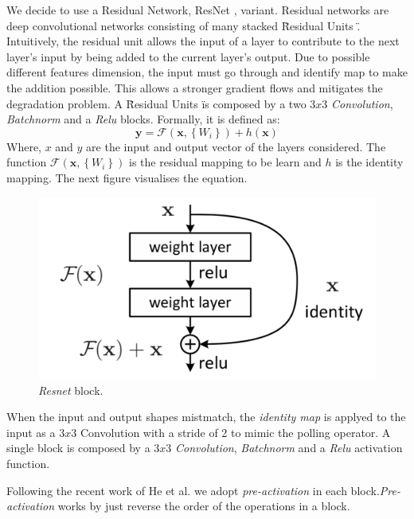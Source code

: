 \documentclass[../document.tex]{subfiles}
\begin{document}
We decide to use a Residual Network, ResNet \cite{he2015deep}, variant. Residual networks are deep convolutional
networks consisting of many stacked \" Residual Units \". Intuitively, the residual unit allows the input of a layer to contribute to the next layer's input by being added to the current layer's output. Due to possible different features dimension, the input must go through and identify map to make the addition possible. This allows a stronger gradient flows and mitigates the degradation problem. A \"Residual Units \" is composed by a two $3x3$ \emph{Convolution}, \emph{Batchnorm} \cite{ioffe2015batch} and a \emph{Relu} blocks. Formally, it is defined as: 
\begin{equation}
    \mathbf{y}=\mathcal{F}\left(\mathbf{x},\left\{W_{i}\right\}\right)+h(\mathbf{x})
    \label{eq : resnet}
\end{equation}
Where, $x$ and $y$ are the input and output vector of the layers considered. The function $\mathcal{F}\left(\mathbf{x},\left\{W_{i}\right\}\right)$ is the residual mapping to be learn and $h$ is the identity mapping. The next figure visualises the equation.

\begin{figure}[H]
    \centering
    \includegraphics[scale=0.3]{../img/implementation/estimator/resnet_block.png}
    \caption{\emph{Resnet} block.}
\end{figure}
When the input and output shapes mistmatch, the \emph{identity map} is applyed to the input as a $3x3$ Convolution with a stride of 2 to mimic the polling operator. A single block is composed by a $3x3$ \emph{Convolution}, \emph{Batchnorm} and a \emph{Relu} activation function. 

Following the recent work of He et al. \cite{he2015identity} we adopt \emph{pre-activation} in each block.\emph{Pre-activation} works by just reverse the order of the operations in a block.
\end{document}
